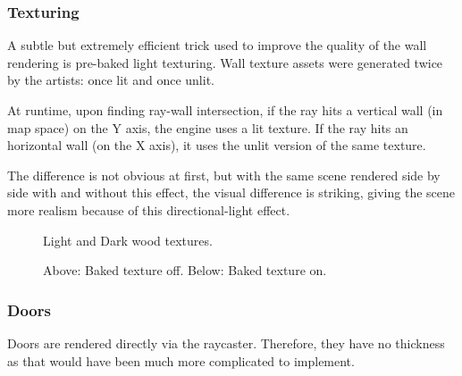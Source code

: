 \subsubsection{Texturing}
A subtle but extremely efficient trick used to improve the quality of the wall rendering is pre-baked light texturing. Wall texture assets were generated twice by the artists: once lit and once unlit.\\
\par
At runtime, upon finding ray-wall intersection, if the ray hits a vertical wall (in map space) on the Y axis, the engine uses a lit texture. If the ray hits an horizontal wall (on the X axis), it uses the unlit version of the same texture.\\
\par
 The difference is not obvious at first, but with the same scene rendered side by side with and without this effect, the visual difference is striking, giving the scene more realism because of this directional-light effect.\\
\par
  \begin{figure}[H]
\centering
 \caption{Light and Dark wood textures.}
 \end{figure}
\par

\begin{minipage}{\textwidth}
\begin{figure}[H]
\centering
 \caption{Above: Baked texture off. Below: Baked texture on.}
 \end{figure}

\begin{figure}[H]
\centering
 
 \end{figure}
 \end{minipage}

 





\subsubsection{Doors}
Doors are rendered directly via the raycaster. Therefore, they have no thickness as that would have been much more complicated to implement.\\
\par
\begin{figure}[H]
 \centering
\end{figure}

